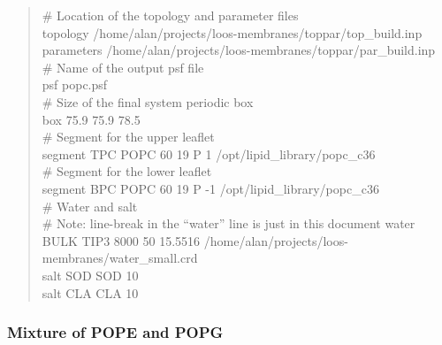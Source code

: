 \documentclass[12pt]{article}
\begin{document}
\begin{quote}
\# Location of the topology and parameter files \\
topology /home/alan/projects/loos-membranes/toppar/top\_build.inp \\
parameters /home/alan/projects/loos-membranes/toppar/par\_build.inp \\

\# Name of the output psf file \\
psf      popc.psf \\

\# Size of the final system periodic box \\
box      75.9  75.9  78.5 \\

\# Segment for the upper leaflet \\
segment TPC       POPC     60    19    P 1      /opt/lipid\_library/popc\_c36
\\
\# Segment for the lower leaflet \\
segment BPC       POPC     60    19    P -1     /opt/lipid\_library/popc\_c36
\\

\# Water and salt \\
\# Note: line-break in the ``water'' line is just in this document
water   BULK     TIP3      8000       50      15.5516 /home/alan/projects/loos-membranes/water\_small.crd \\
salt    SOD       SOD      10 \\
salt    CLA       CLA      10 \\
\end{quote}

\subsubsection{Mixture of POPE and POPG}
\end{document}
